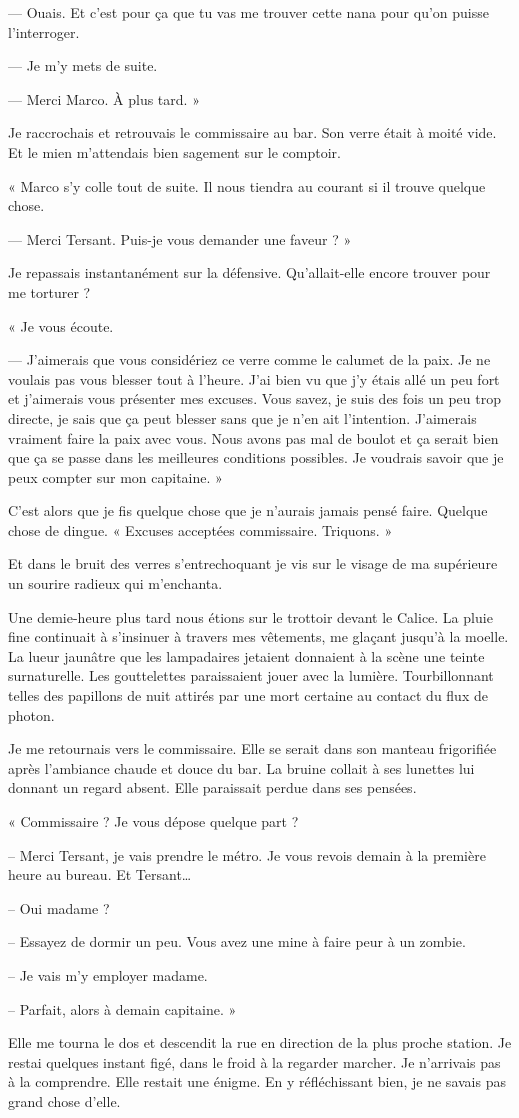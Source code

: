 — Ouais. Et c'est pour ça que tu vas me trouver cette nana pour qu'on puisse l'interroger.

— Je m'y mets de suite. 

— Merci Marco. À plus tard. »

Je raccrochais et retrouvais le commissaire au bar. Son verre était à moité vide. Et le mien m'attendais bien sagement 
sur le comptoir.

« Marco s'y colle tout de suite. Il nous tiendra au courant si il trouve quelque chose.

— Merci Tersant. Puis-je vous demander une faveur ? »

Je repassais instantanément sur la défensive. Qu'allait-elle encore trouver pour me torturer ?

« Je vous écoute.

— J'aimerais que vous considériez ce verre comme le calumet de la paix. Je ne voulais pas vous blesser tout à l'heure. 
J'ai bien vu que j'y étais allé un peu fort et j'aimerais vous présenter mes excuses. Vous savez, je suis des fois un 
peu trop directe, je sais que ça peut blesser sans que je n'en ait l'intention. J'aimerais vraiment faire la paix avec 
vous. Nous avons pas mal de boulot et ça serait bien que ça se passe dans les meilleures conditions possibles. Je 
voudrais savoir que je peux compter sur mon capitaine. »

C'est alors que je fis quelque chose que je n'aurais jamais pensé faire. Quelque chose de dingue. « Excuses acceptées 
commissaire. Triquons. »

Et dans le bruit des verres s'entrechoquant je vis sur le visage de ma supérieure un sourire radieux qui m'enchanta.

Une demie-heure plus tard nous étions sur le trottoir devant le Calice. La pluie fine continuait à s'insinuer à travers 
mes vêtements, me glaçant jusqu'à la moelle. La lueur jaunâtre que les lampadaires jetaient donnaient à la scène une 
teinte surnaturelle. Les gouttelettes paraissaient jouer avec la lumière. Tourbillonnant telles des papillons de nuit 
attirés par une mort certaine au contact du flux de photon.

Je me retournais vers le commissaire. Elle se serait dans son manteau frigorifiée après l'ambiance chaude et douce du
bar. La bruine collait à ses lunettes lui donnant un regard absent. Elle paraissait perdue dans ses pensées.

« Commissaire ? Je vous dépose quelque part ?

-- Merci Tersant, je vais prendre le métro. Je vous revois demain à la première heure au bureau. Et Tersant… 

-- Oui madame ?

-- Essayez de dormir un peu. Vous avez une mine à faire peur à un zombie.

-- Je vais m'y employer madame. 

-- Parfait, alors à demain capitaine. »

Elle me tourna le dos et descendit la rue en direction de la plus proche station. Je restai quelques instant figé, dans
le froid à la regarder marcher. Je n'arrivais pas à la comprendre. Elle restait une énigme. En y réfléchissant bien, je
ne savais pas grand chose d'elle.
